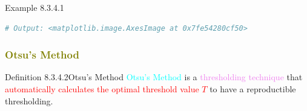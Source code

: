 \documentclass{book}
\begin{document}
\begin{egBox}{Example 8.3.4.1}{}
\begin{lstlisting}[language=Python, basicstyle=\ttfamily\small, keywordstyle=\color{blue}, commentstyle=\color{forestgreen}, stringstyle=\color{red}, showstringspaces=false]
# Output: <matplotlib.image.AxesImage at 0x7fe54280cf50>
    \end{lstlisting}
    \begin{center}
    \end{center}
\end{egBox}
\textcolor{olive}{\subsubsection{Otsu's Method}}
\begin{defBox}{Definition 8.3.4.2}{Otsu's Method}
    \textcolor{cyan}{Otsu's Method} is a \textcolor{violet}{thresholding technique} that \textcolor{red}{automatically calculates the optimal threshold value $T$} to have a reproductible thresholding.
\end{defBox}
\end{document}
